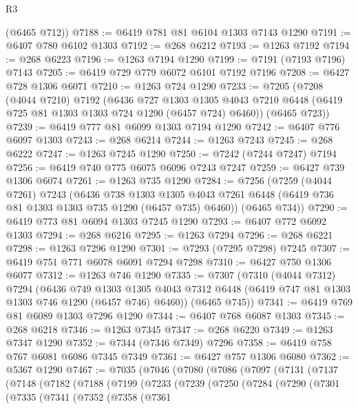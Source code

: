 \begin{lexlean}{R3}
\begin{coremodule}
      (@6465 @712))
@7188 := @6419 @781 @81 @6104 @1303 @7143 @1290
@7191 := @6407 @780 @6102 @1303
@7192 := @268 @6212
@7193 := @1263 @7192
@7194 := @268 @6223
@7196 := @1263 @7194 @1290
@7199 := @7191 (@7193 @7196) @7143
@7205 := @6419 @729 @779 @6072 @6101 @7192 @7196
@7208 := @6427 @728 @1306 @6071
@7210 := @1263 @724 @1290
@7233 := @7205
    (@7208
      (@4044 @7210)
      @7192
      (@6436
        @727
        @1303
        @1305
        @4043
        @7210
        @6448
        (@6419 @725 @81 @1303 @1303 @724 @1290 (@6457 @724) @6460))
      (@6465 @723))
@7239 := @6419 @777 @81 @6099 @1303 @7194 @1290
@7242 := @6407 @776 @6097 @1303
@7243 := @268 @6214
@7244 := @1263 @7243
@7245 := @268 @6222
@7247 := @1263 @7245 @1290
@7250 := @7242 (@7244 @7247) @7194
@7256 := @6419 @740 @775 @6075 @6096 @7243 @7247
@7259 := @6427 @739 @1306 @6074
@7261 := @1263 @735 @1290
@7284 := @7256
    (@7259
      (@4044 @7261)
      @7243
      (@6436
        @738
        @1303
        @1305
        @4043
        @7261
        @6448
        (@6419 @736 @81 @1303 @1303 @735 @1290 (@6457 @735) @6460))
      (@6465 @734))
@7290 := @6419 @773 @81 @6094 @1303 @7245 @1290
@7293 := @6407 @772 @6092 @1303
@7294 := @268 @6216
@7295 := @1263 @7294
@7296 := @268 @6221
@7298 := @1263 @7296 @1290
@7301 := @7293 (@7295 @7298) @7245
@7307 := @6419 @751 @771 @6078 @6091 @7294 @7298
@7310 := @6427 @750 @1306 @6077
@7312 := @1263 @746 @1290
@7335 := @7307
    (@7310
      (@4044 @7312)
      @7294
      (@6436
        @749
        @1303
        @1305
        @4043
        @7312
        @6448
        (@6419 @747 @81 @1303 @1303 @746 @1290 (@6457 @746) @6460))
      (@6465 @745))
@7341 := @6419 @769 @81 @6089 @1303 @7296 @1290
@7344 := @6407 @768 @6087 @1303
@7345 := @268 @6218
@7346 := @1263 @7345
@7347 := @268 @6220
@7349 := @1263 @7347 @1290
@7352 := @7344 (@7346 @7349) @7296
@7358 := @6419 @758 @767 @6081 @6086 @7345 @7349
@7361 := @6427 @757 @1306 @6080
@7362 := @5367 @1290
@7467 := @7035
    (@7046
      (@7080
        (@7086
          (@7097
            (@7131
              (@7137
                (@7148
                  (@7182
                    (@7188
                      (@7199
                        (@7233
                          (@7239
                            (@7250
                              (@7284
                                (@7290
                                  (@7301
                                    (@7335
                                      (@7341
                                        (@7352
                                          (@7358
                                            (@7361

\end{coremodule}
\end{lexlean}
